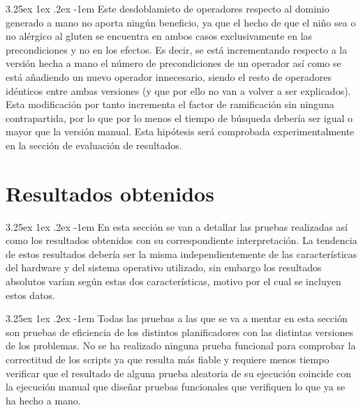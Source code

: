 \documentclass{article}
\makeatletter
\renewcommand\paragraph{\@startsection{paragraph}{5}{\z@}%
      {3.25ex \@plus1ex \@minus.2ex}%
      {-1em}%
      {\normalfont\normalsize\bfseries}}
\makeatother
\begin{document}
    \paragraph{}
    Este desdoblamieto de operadores respecto al dominio generado a mano no aporta ningún beneficio, ya que el hecho de que el niño sea o no alérgico al gluten se encuentra en ambos casos exclusivamente en las precondiciones y no en los efectos. Es decir, se está incrementando respecto a la versión hecha a mano el número de precondiciones de un operador así como se está añadiendo un nuevo operador innecesario, siendo el resto de operadores idénticos entre ambas versiones (y que por ello no van a volver a ser explicados). Esta modificación por tanto incrementa el factor de ramificación sin ninguna contrapartida, por lo que por lo menos el tiempo de búsqueda debería ser igual o mayor que la versión manual. Esta hipótesis será comprobada experimentalmente en la sección de evaluación de resultados.
    
    \pagebreak
    
    \section{Resultados obtenidos}
    \paragraph{}
    En esta sección se van a detallar las pruebas realizadas así como los resultados obtenidos con su correspondiente interpretación. La tendencia de estos resultados debería ser la misma independientemente de las características del hardware y del sistema operativo utilizado, sin embargo los resultados absolutos varían según estas dos características, motivo por el cual se incluyen estos datos.
    
    \paragraph{}
    Todas las pruebas a las que se va a mentar en esta sección son pruebas de eficiencia de los distintos planificadores con las distintas versiones de los problemas. No se ha realizado ninguna prueba funcional para comprobar la correctitud de los scripts ya que resulta más fiable y requiere menos tiempo verificar que el resultado de alguna prueba aleatoria de su ejecución coincide con la ejecución manual que diseñar pruebas funcionales que verifiquen lo que ya se ha hecho a mano.
    
\end{document}
